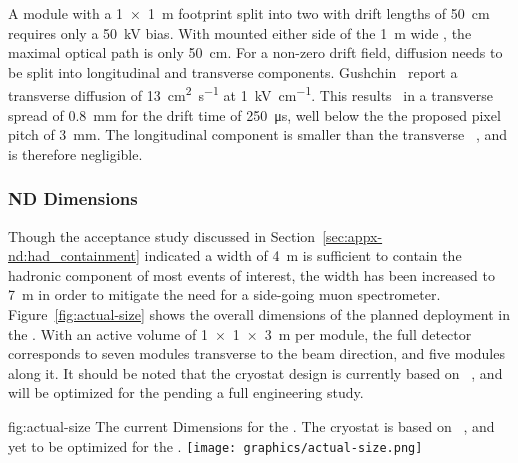 A module with a \SI{1x1}{\metre} footprint split into two  with drift lengths of \SI{50}{\centi\metre} requires only a \SI{50}{\kilo\volt} bias.
With  mounted either side of the \SI{1}{\metre} wide , the maximal optical path is only \SI{50}{\centi\metre}.
For a non-zero drift field, diffusion needs to be split into longitudinal and transverse components. Gushchin~\cite{gushchin} report a transverse diffusion of \SI{13}{\centi\metre\squared\per\second} at \SI{1}{\kilo\volt\per\centi\metre}.
This results~\cite{Chepel:2012sj} in a transverse spread of \SI{0.8}{\milli\metre} for the drift time of \SI{250}{\micro\second}, well below the the proposed pixel pitch of \SI{3}{\milli\metre}.
The longitudinal component is smaller than the transverse ~\cite{Chepel:2012sj},  and is therefore negligible.

\subsubsection{ND Dimensions}
\label{sec:appx-nd:det_dimensions}

Though the acceptance study discussed in Section~\ref{sec:appx-nd:had_containment} indicated a width of \SI{4}{\metre} is sufficient to contain the hadronic component of most events of interest, the width has been increased to 
\SI{7}{\metre} in order to mitigate the need for a side-going muon spectrometer.
Figure~\ref{fig:actual-size} shows the overall dimensions of the planned  deployment in the   . 
With an active volume of \SI{1x1x3}{\metre} per module, the full  detector corresponds to seven modules transverse to the beam direction, and five modules along it. 
It should be noted that the cryostat design is currently based on ~\cite{Abi:2017aow}, and will be optimized for the   pending a full engineering study.  

\begin{dunefigure}{fig:actual-size}
{The current  Dimensions for the   . The cryostat is based on ~\cite{Abi:2017aow}, and yet to be optimized for the   .}
	\texttt{[image: graphics/actual-size.png]}
\end{dunefigure}

